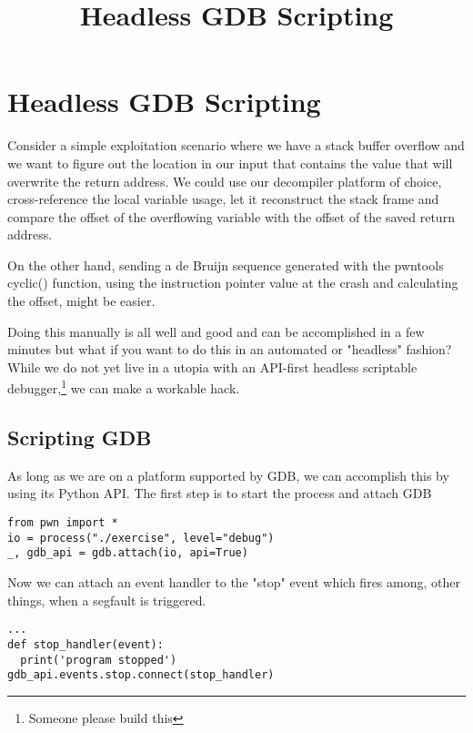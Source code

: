 \documentclass[twocolumn]{article}
\begin{document}
\title{Headless GDB Scripting}
\date{}
\section*{Headless GDB Scripting}

\vspace*{-0.5\baselineskip}

Consider a simple exploitation scenario where we have a stack buffer overflow and we want to figure out the location in our input that contains the value that will overwrite the return address. We could use our decompiler platform of choice, cross-reference the local variable usage, let it reconstruct the stack frame and compare the offset of the overflowing variable with the offset of the saved return address.

On the other hand, sending a de Bruijn sequence generated with the pwntools cyclic() function, using the instruction pointer value at the crash and calculating the offset, might be easier.

Doing this manually is all well and good and can be accomplished in a few minutes but what if you want to do this in an automated or "headless" fashion? While we do not yet live in a utopia with an API-first headless scriptable debugger,\footnote{Someone please build this} we can make a workable hack.

\vspace*{-0.5\baselineskip}
\subsection*{Scripting GDB}

As long as we are on a platform supported by GDB, we can accomplish this by using its Python API. The first step is to start the process and attach GDB

\begin{verbatim}
from pwn import *
io = process("./exercise", level="debug")
_, gdb_api = gdb.attach(io, api=True)
\end{verbatim}

Now we can attach an event handler to the "stop" event which fires among, other things, when a segfault is triggered.

\begin{verbatim}
...
def stop_handler(event):
  print('program stopped')
gdb_api.events.stop.connect(stop_handler)
\end{verbatim}
\end{document}
